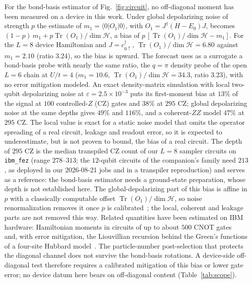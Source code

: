 \documentclass[aps,prb,onecolumn,superscriptaddress,longbibliography,floatfix]{revtex4-2}
\begin{document}
For the bond-basis estimator of Fig.~\ref{fig:circuit}, no off-diagonal moment has been measured on a device in this work. Under global depolarizing noise of strength $p$ the estimate of $m_1=\langle 0|O_1|0\rangle$, with $O_1=J^\dagger(H-E_0)J$, becomes $(1-p)\,m_1+p\operatorname{Tr}(O_1)/\dim\mathcal H$, a bias of $p\,[\operatorname{Tr}(O_1)/\dim\mathcal H-m_1]$. For the $L=8$ device Hamiltonian and $J=c^{\dagger}_{0\uparrow}$, $\operatorname{Tr}(O_1)/\dim\mathcal H=6.80$ against $m_1=2.10$ (ratio $3.24$), so the bias is upward. The forecast uses as a surrogate a bond-basis probe with nearly the same ratio, the $q=\pi$ density probe of the open $L=6$ chain at $U/t=4$ ($m_1=10.6$, $\operatorname{Tr}(O_1)/\dim\mathcal H=34.3$, ratio $3.23$), with no error mitigation modeled. An exact density-matrix simulation with local two-qubit depolarizing noise at $\varepsilon=2.5\times10^{-3}$ puts its first-moment bias at $13\%$ of the signal at $100$ controlled-$Z$ (CZ) gates and $38\%$ at $295$ CZ; global depolarizing noise at the same depths gives $49\%$ and $116\%$, and a coherent-$ZZ$ model $47\%$ at $295$ CZ. The local value is exact for a static noise model that omits the operator spreading of a real circuit, leakage and readout error, so it is expected to underestimate, but is not proven to bound, the bias of a real circuit. The depth of $295$ CZ is the median transpiled CZ count of our $L=8$ sampler circuits on \texttt{ibm\_fez} (range $278$--$313$; the $12$-qubit circuits of the companion's family need $213$, as deployed in our 2026-08-21 jobs and in a transpiler reproduction) and serves as a reference: the bond-basis estimator needs a ground-state preparation, whose depth is not established here. The global-depolarizing part of this bias is affine in $p$ with a classically computable offset $\operatorname{Tr}(O_1)/\dim\mathcal H$, so noise renormalization removes it once $p$ is calibrated~\cite{Vovrosh2021,Kiss2025}; the local, coherent and leakage parts are not removed this way. Related quantities have been estimated on IBM hardware: Hamiltonian moments in circuits of up to about $500$ CNOT gates~\cite{Vallury2023} and, with error mitigation, the Liouvillian recursion behind the Green's functions of a four-site Hubbard model~\cite{Leblanc2026}. The particle-number post-selection that protects the diagonal channel does not survive the bond-basis rotations. A device-side off-diagonal test therefore requires a calibrated mitigation of this bias or lower gate error; no device datum here bears on off-diagonal content (Table~\ref{tab:scope}).
\end{document}
